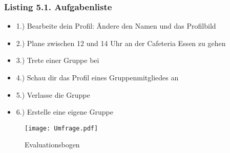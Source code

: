 \documentclass[a4paper]{scrreprt}
\begin{document}
\subsubsection*{Listing 5.1. Aufgabenliste}
\begin{itemize}
	\item 1.) Bearbeite dein Profil: Ändere den Namen und das Profilbild
	\item 2.) Plane zwischen 12 und 14 Uhr an der Cafeteria Essen zu gehen
	\item 3.) Trete einer Gruppe bei
	\item 4.) Schau dir das Profil eines Gruppenmitgliedes an
	\item 5.) Verlasse die Gruppe
	\item 6.) Erstelle eine eigene Gruppe
\end{itemize}
\newpage
\begin{figure}[H]
	\centering
  \texttt{[image: Umfrage.pdf]}
	\caption{Evaluationsbogen}
	\label{fig2}
\end{figure}
\newpage
\end{document}
